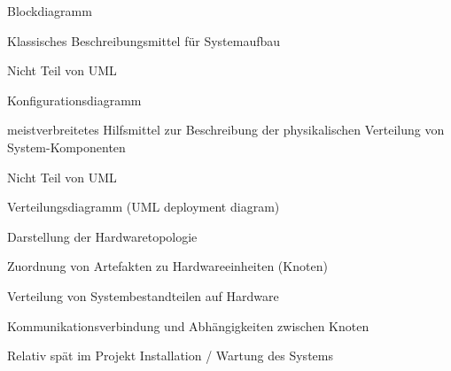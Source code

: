 \documentclass[a4paper]{article}
\begin{document}
\begin{multicols}{3}
  \begin{itemize*}
    \item Blockdiagramm
    \begin{itemize*}
      \item Klassisches Beschreibungsmittel für Systemaufbau
      \item Nicht Teil von UML
    \end{itemize*}
    \item Konfigurationsdiagramm
    \begin{itemize*}
      \item meistverbreitetes Hilfsmittel zur Beschreibung der physikalischen Verteilung von System-Komponenten
      \item Nicht Teil von UML
    \end{itemize*}
    \item Verteilungsdiagramm (UML deployment diagram)
    \begin{itemize*}
      \item Darstellung der Hardwaretopologie
      \item Zuordnung von Artefakten zu Hardwareeinheiten (Knoten)
      \begin{itemize*}
        \item Verteilung von Systembestandteilen auf Hardware
      \end{itemize*}
      \item Kommunikationsverbindung und Abhängigkeiten zwischen Knoten
      \item Relativ spät im Projekt Installation / Wartung des Systems
    \end{itemize*}
  \end{itemize*}


\end{multicols}
\end{document}
